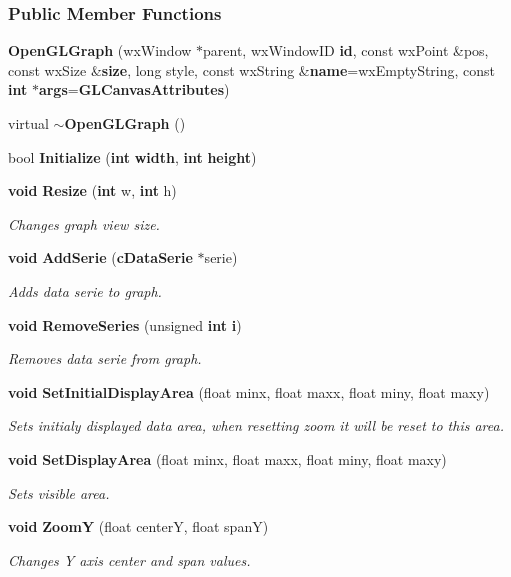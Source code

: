 \subsubsection*{Public Member Functions}
\begin{DoxyCompactItemize}
\item 
{\bf Open\+G\+L\+Graph} (wx\+Window $\ast$parent, wx\+Window\+ID {\bf id}, const wx\+Point \&pos, const wx\+Size \&{\bf size}, long style, const wx\+String \&{\bf name}=wx\+Empty\+String, const {\bf int} $\ast${\bf args}={\bf G\+L\+Canvas\+Attributes})
\item 
virtual {\bf $\sim$\+Open\+G\+L\+Graph} ()
\item 
bool {\bf Initialize} ({\bf int} {\bf width}, {\bf int} {\bf height})
\item 
{\bf void} {\bf Resize} ({\bf int} w, {\bf int} h)
\begin{DoxyCompactList}\small\item\em Changes graph view size. \end{DoxyCompactList}\item 
{\bf void} {\bf Add\+Serie} ({\bf c\+Data\+Serie} $\ast$serie)
\begin{DoxyCompactList}\small\item\em Adds data serie to graph. \end{DoxyCompactList}\item 
{\bf void} {\bf Remove\+Series} (unsigned {\bf int} {\bf i})
\begin{DoxyCompactList}\small\item\em Removes data serie from graph. \end{DoxyCompactList}\item 
{\bf void} {\bf Set\+Initial\+Display\+Area} (float minx, float maxx, float miny, float maxy)
\begin{DoxyCompactList}\small\item\em Sets initialy displayed data area, when resetting zoom it will be reset to this area. \end{DoxyCompactList}\item 
{\bf void} {\bf Set\+Display\+Area} (float minx, float maxx, float miny, float maxy)
\begin{DoxyCompactList}\small\item\em Sets visible area. \end{DoxyCompactList}\item 
{\bf void} {\bf ZoomY} (float centerY, float spanY)
\begin{DoxyCompactList}\small\item\em Changes Y axis center and span values. \end{DoxyCompactList}\item 

\end{DoxyCompactItemize}
